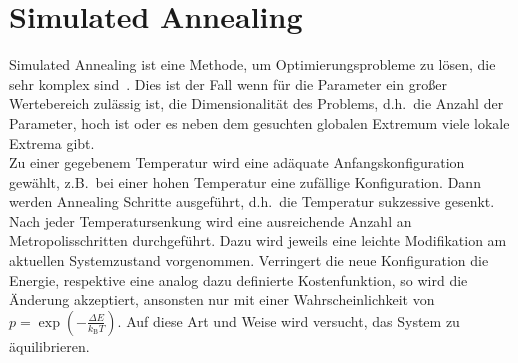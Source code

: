 \section{Simulated Annealing}
Simulated Annealing ist eine Methode, um Optimierungsprobleme zu lösen, die sehr komplex sind~\parencite{nr}. Dies ist der Fall wenn für die Parameter ein großer Wertebereich zulässig ist, die Dimensionalität des Problems, d.h.\ die Anzahl der Parameter, hoch ist oder es neben dem gesuchten globalen Extremum viele lokale Extrema gibt. \\
Zu einer gegebenem Temperatur wird eine adäquate Anfangskonfiguration gewählt, z.B.\ bei einer hohen Temperatur eine zufällige Konfiguration. Dann werden Annealing Schritte ausgeführt, d.h.\ die Temperatur sukzessive gesenkt. Nach jeder Temperatursenkung wird eine ausreichende Anzahl an Metropolisschritten durchgeführt. Dazu wird jeweils eine leichte Modifikation am aktuellen Systemzustand vorgenommen. Verringert die neue Konfiguration die Energie, respektive eine analog dazu definierte Kostenfunktion, so wird die Änderung akzeptiert, ansonsten nur mit einer Wahrscheinlichkeit von $p=\exp\left(-\frac{\Delta E}{k_\mathrm{B}T}\right)$. Auf diese Art und Weise wird versucht, das System zu äquilibrieren.



